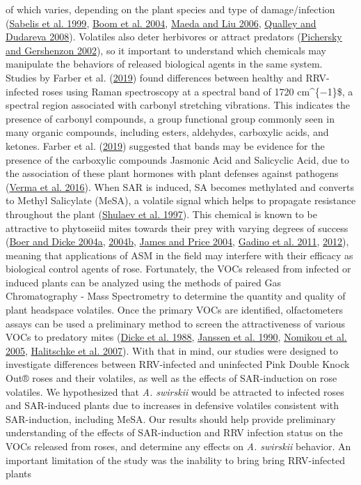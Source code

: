 \documentclass{ufdissertation}[overrideChapters] %
\begin{document}
{of which varies, depending on the plant species and type of damage/infection (\protect\hyperlink{ref-Sabelis1999}{Sabelis et al. 1999}, \protect\hyperlink{ref-Boom2004}{Boom et al. 2004}, \protect\hyperlink{ref-Maeda2006}{Maeda and Liu 2006}, \protect\hyperlink{ref-Qualley2008}{Qualley and Dudareva 2008}). Volatiles also deter herbivores or attract predators (\protect\hyperlink{ref-Pichersky2002}{Pichersky and Gershenzon 2002}), so it important to understand which chemicals may manipulate the behaviors of released biological agents in the same system. Studies by Farber et al. (\protect\hyperlink{ref-Farber2019}{2019}) found differences between healthy and RRV-infected roses using Raman spectroscopy at a spectral band of 1720 \si{\centi\meter}\^{}\{−1\}\$, a spectral region associated with carbonyl stretching vibrations. This indicates the presence of carbonyl compounds, a group functional group commonly seen in many organic compounds, including esters, aldehydes, carboxylic acids, and ketones. Farber et al. (\protect\hyperlink{ref-Farber2019}{2019}) suggested that bands may be evidence for the presence of the carboxylic compounds Jasmonic Acid and Salicyclic Acid, due to the association of these plant hormones with plant defenses against pathogens (\protect\hyperlink{ref-Verma2016}{Verma et al. 2016}). When SAR is induced, SA becomes methylated and converts to Methyl Salicylate (MeSA), a volatile signal which helps to propagate resistance throughout the plant (\protect\hyperlink{ref-Shulaev1997}{Shulaev et al. 1997}). This chemical is known to be attractive to phytoseiid mites towards their prey with varying degrees of success (\protect\hyperlink{ref-Boer2004a}{Boer and Dicke 2004a}, \protect\hyperlink{ref-Boer2004b}{2004b}, \protect\hyperlink{ref-James2004}{James and Price 2004}, \protect\hyperlink{ref-Gadino2011}{Gadino et al. 2011}, \protect\hyperlink{ref-Gadino2012}{2012}), meaning that applications of ASM in the field may interfere with their efficacy as biological control agents of rose. Fortunately, the VOCs released from infected or induced plants can be analyzed using the methods of paired Gas Chromatography - Mass Spectrometry to determine the quantity and quality of plant headspace volatiles. Once the primary VOCs are identified, olfactometers assays can be used a preliminary method to screen the attractiveness of various VOCs to predatory mites (\protect\hyperlink{ref-Dicke1988}{Dicke et al. 1988}, \protect\hyperlink{ref-Janssen1990}{Janssen et al. 1990}, \protect\hyperlink{ref-Nomikou2005}{Nomikou et al. 2005}, \protect\hyperlink{ref-Halitschke2007}{Halitschke et al. 2007}). With that in mind, our studies were designed to investigate differences between RRV-infected and uninfected Pink Double Knock Out® roses and their volatiles, as well as the effects of SAR-induction on rose volatiles. We hypothesized that \emph{A. swirskii} would be attracted to infected roses and SAR-induced plants due to increases in defensive volatiles consistent with SAR-induction, including MeSA. Our results should help provide preliminary understanding of the effects of SAR-induction and RRV infection status on the VOCs released from roses, and determine any effects on \emph{A. swirskii} behavior. An important limitation of the study was the inability to bring bring RRV-infected plants }
\end{document}
